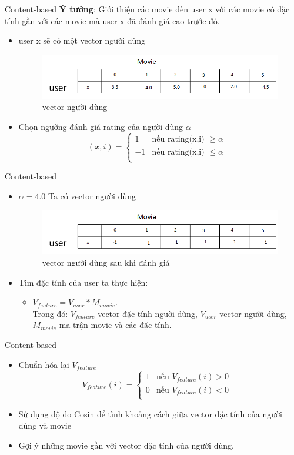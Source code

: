 \documentclass{beamer}
\newcommand{\bi}{\begin{itemize}}
\newcommand{\ei}{\end{itemize}}
\begin{document}
\begin{frame}{Content-based}
\textbf{Ý tưởng}: Giới thiệu các movie đến user x với các movie có đặc tính gần với các movie mà user x đã đánh giá cao trước đó.
\bi
\item user x sẽ có một vector người dùng
\begin{figure}[h]
\begin{center}
\includegraphics[width =0.7 \textwidth]{img1.png}
\caption{vector người dùng}
\end{center}
\end{figure}
\item Chọn ngưỡng đánh giá rating của người dùng $\alpha$
\begin{displaymath}
(x,i) = \left\{ \begin{array}{ll}
1 & \textrm{nếu rating(x,i) $\geq \alpha $}\\
-1 & \textrm{nếu rating(x,i) $\le \alpha$ }\\
\end{array} \right.
\end{displaymath}
\ei
\end{frame}
\begin{frame}{Content-based}
\bi
\item $\alpha = 4.0$ Ta có vector người dùng
\begin{figure}[h]
\begin{center}
\includegraphics[width =0.7 \textwidth]{img2.png}
\caption{vector người dùng sau khi đánh giá}
\end{center}
\end{figure}
\item Tìm đặc tính của user ta thực hiện:
\bi
\item  $V_{feature}  =  V_{user} * M_{movie}$. \\
Trong đó: $V_{feature}$ vector đặc tính người dùng, $V_{user}$ vector người dùng, $M_{movie}$ ma trận movie và các đặc tính.
\ei
\ei
\end{frame}
\begin{frame}{Content-based}
\bi
\item Chuẩn hóa lại $V_{feature}$
\begin{displaymath}
V_{feature}(i) = \left\{ \begin{array}{ll}
1 & \textrm{nếu  $V_{feature}(i) > 0$}\\
0 & \textrm{nếu  $V_{feature}(i) < 0$ }\\
\end{array} \right.
\end{displaymath}
\item Sử dụng độ đo Cosin để tình khoảng cách giữa vector đặc tính của người dùng và movie
\item Gợi ý những movie gần với vector đặc tính của người dùng.
\ei
\end{frame}
\end{document}
